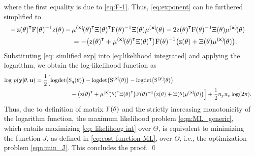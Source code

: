 where the first equality is due to \eqref{eq:F-1}. Thus, \eqref{eq:exponent} can be furthered simplified to 
\begin{equation}\label{eq: simlified exp}
    \begin{split}
        -\,
        \vcz(\vctheta)^\tr \mxF(\vctheta)^{-1} \vcz(\vctheta) 
        \,-\, 
        &
        \mubfxtheta^\tr\Xi(\vctheta)^\tr \mxF(\vctheta)^{-1}  \Xi(\vctheta) \mubfxtheta 
        - 
        2 \vcz(\vctheta)^\tr \mxF(\vctheta)^{-1} \Xi(\vctheta) \mubfxtheta
        \\
        & = 
        -
        \big(\vcz(\vctheta)^\tr + \mubfxtheta^\tr\Xi(\vctheta)^\tr\big)
        \mxF(\vctheta)^{-1}
        \big(\vcz(\vctheta) + \Xi(\vctheta)\mubfxtheta\big).
    \end{split}
\end{equation}
Substituting \eqref{eq: simlified exp} into \eqref{eq:likelihood integrated} and applying the logarithm, we obtain the log-likelihood function as
\begin{equation}
\begin{split}
    \log\, p(\mathbf{y}|\vctheta,\mathbf{u}) 
    &= 
    \frac{1}{2} 
    \Big[
        \logdet\big(\Sqtheta\big)
        - 
        \logdet\big(\Sbfxtheta\big)
        - 
        \logdet\big(\Sbfytheta\big) 
    \\&
    \qquad \qquad \qquad 
        - 
        \big(\vcz(\vctheta)^\tr + \mubfxtheta^\tr\Xi(\vctheta)^\tr\big)
        \mxF(\vctheta)^{-1}
        \big(\vcz(\vctheta) + \Xi(\vctheta)\mubfxtheta\big)
    \Big] + \frac12 \Ny\nD\log(2\pi).
\end{split}
\end{equation}
Thus, due to definition of matrix ${ \mathrm{F} }({ \mathrm{\theta} })$ and the strictly increasing monotonicity of the logarithm function, 
the maximum likelihood problem \eqref{eqn:ML_generic}, which entails maximizing \eqref{eq: likelihoog int} over $\Theta$, is equivalent to minimizing the function $J$, as defined in \eqref{eq:cost function ML}, over $\Theta$, i.e., the optimization problem \eqref{eqn:min_J}.
This concludes the proof.
\qed
